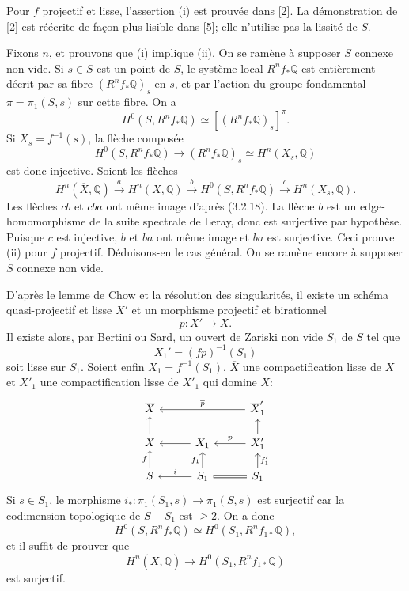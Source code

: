 \documentclass[10pt]{article}
\newcommand{\Q}{\mathbb Q}
\begin{document}
Pour $f$ projectif et lisse, l'assertion (i) est prouvée dans [2]. La démonstration de [2] est réécrite de façon plus lisible dans [5]; elle n'utilise pas la lissité de $S$.

Fixons $n$, et prouvons que (i) implique (ii). On se ramène à supposer $S$ connexe non vide. Si $s\in S$ est un point de $S$, le système local $R^nf_*\Q$ est entièrement décrit par sa fibre $(R^nf_*\Q)_s$ en $s$, et par l'action du groupe fondamental $\pi=\pi_1(S,s)$ sur cette fibre. On a
\[
H^0(S,R^nf_*\Q)\simeq[(R^nf_*\Q)_s]^\pi.
\]
Si $X_s=f^{-1}(s)$, la flèche composée
\[
H^0(S,R^nf_*\Q)\longrightarrow (R^nf_*\Q)_s\simeq H^n(X_s,\Q)
\]
est donc injective. Soient les flèches
\[
H^n(\overline X,\Q)\xrightarrow{a}H^n(X,\Q)\xrightarrow{b}
H^0(S,R^nf_*\Q)\xrightarrow{c}H^n(X_s,\Q).
\]
Les flèches $cb$ et $cba$ ont même image d'après (3.2.18). La flèche $b$ est un edge-homomorphisme de la suite spectrale de Leray, donc est surjective par hypothèse. Puisque $c$ est injective, $b$ et $ba$ ont même image et $ba$ est surjective. Ceci prouve (ii) pour $f$ projectif. Déduisons-en le cas général. On se ramène encore à supposer $S$ connexe non vide.

D'après le lemme de Chow et la résolution des singularités, il existe un schéma quasi-projectif et lisse $X'$ et un morphisme projectif et birationnel
\[
p:X'\longrightarrow X.
\]
Il existe alors, par Bertini ou Sard, un ouvert de Zariski non vide $S_1$ de $S$ tel que
\[
X_1'=(fp)^{-1}(S_1)
\]
soit lisse sur $S_1$. Soient enfin $X_1=f^{-1}(S_1)$, $\overline X$ une compactification lisse de $X$ et $\overline X'_1$ une compactification lisse de $X'_1$ qui domine $\overline X$:
\[
\begin{tikzcd}[row sep=1.35em,column sep=2.8em]
\overline X && \overline X'_1 \arrow[ll,"\overline p"']\\
X \arrow[u] & X_1 \arrow[l] & X'_1 \arrow[l,"p"'] \arrow[u]\\
S \arrow[u,"f"] & S_1 \arrow[l,"i"'] \arrow[u,"f_1"] & S_1 \arrow[l,equal] \arrow[u,"f'_1"']
\end{tikzcd}
\]
Si $s\in S_1$, le morphisme $i_*:\pi_1(S_1,s)\to\pi_1(S,s)$ est surjectif car la codimension topologique de $S-S_1$ est $\ge2$. On a donc
\[
H^0(S,R^nf_*\Q)\simeq H^0(S_1,R^nf_{1*}\Q),
\]
et il suffit de prouver que
\[
H^n(\overline X,\Q)\longrightarrow H^0(S_1,R^nf_{1*}\Q)
\]
est surjectif.
\end{document}
